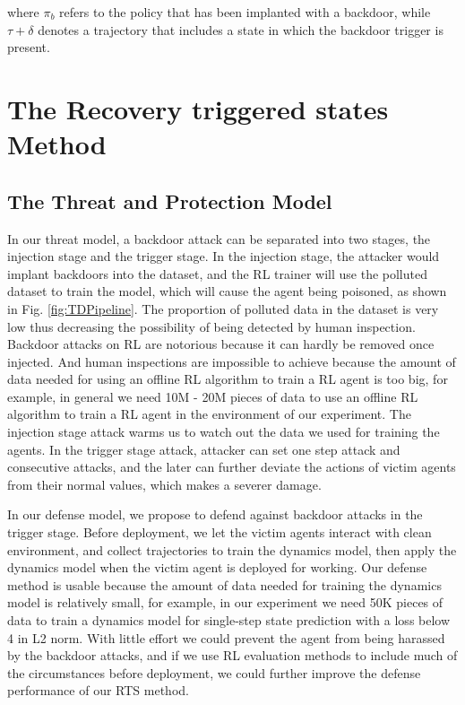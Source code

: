 \documentclass[letterpaper, 10 pt, conference]{ieeeconf}  %
\begin{document}
where $\pi_b$ refers to the policy that has been implanted with a backdoor, while $\tau + \delta$ denotes a trajectory that includes a state in which the backdoor trigger is present.


\section{The Recovery triggered states Method}
\subsection{The Threat and Protection Model}
\iffalse
\begin{figure}
    \centering
    \texttt{[image: Picture/Attacker1.png]}
    \caption{Injection stage}
    \label{fig:Inject}
    \centering
    \texttt{[image: Picture/Attacker2.png]}
    \caption{Trigger stage}
    \label{Trigger}
    \centering
    \texttt{[image: Picture/Defender3.png]}
    \caption{Defender's protect}
    \label{defense}
\end{figure}
\fi

In our threat model, a backdoor attack can be separated into two stages, the injection stage and the trigger stage. In the injection stage, the attacker would implant backdoors into the dataset, and the RL trainer will use the polluted dataset to train the model, which will cause the agent being poisoned, as shown in Fig. \ref{fig:TDPipeline}. The proportion of polluted data in the dataset is very low \cite{trojanrobot, trojdrl} thus decreasing the possibility of being detected by human inspection. Backdoor attacks on RL are notorious because it can hardly be removed once injected. And human inspections are impossible to achieve because the amount of data needed for using an offline RL algorithm to train a RL agent is too big, for example, in general we need 10M - 20M pieces of data to use an offline RL algorithm to train a RL agent in the environment of our experiment. The injection stage attack warms us to watch out the data we used for training the agents. In the trigger stage attack, attacker can set one step attack and consecutive attacks, and the later can further deviate the actions of victim agents from their normal values, which makes a severer damage.

In our defense model, we propose to defend against backdoor attacks in the trigger stage. Before deployment, we let the victim agents interact with clean environment, and collect trajectories to train the dynamics model, then apply the dynamics model when the victim agent is deployed for working. Our defense method is usable because the amount of data needed for training the dynamics model is relatively small, for example, in our experiment we need 50K pieces of data to train a dynamics model for single-step state prediction with a loss below 4 in L2 norm. With little effort we could prevent the agent from being harassed by the backdoor attacks, and if we use RL evaluation methods to include much of the circumstances before deployment, we could further improve the defense performance of our RTS method.
\end{document}
